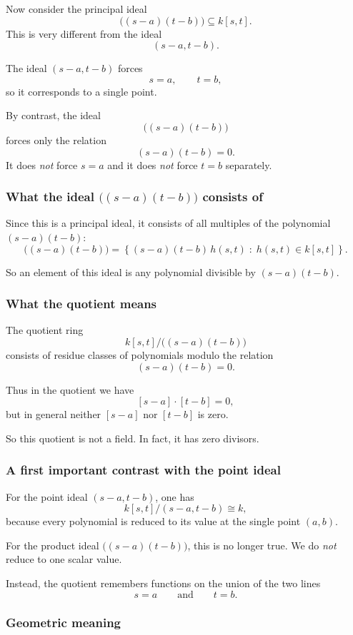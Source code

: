 \documentclass[12pt,a4paper]{article}
\theoremstyle{notespace}
\theoremstyle{definition}
\begin{document}
Now consider the principal ideal
\[
\bigl((s-a)(t-b)\bigr)\subseteq k[s,t].
\]
This is very different from the ideal
\[
(s-a,t-b).
\]

The ideal \((s-a,t-b)\) forces
\[
s=a,\qquad t=b,
\]
so it corresponds to a single point.

By contrast, the ideal
\[
\bigl((s-a)(t-b)\bigr)
\]
forces only the relation
\[
(s-a)(t-b)=0.
\]
It does \emph{not} force \(s=a\) and it does \emph{not} force \(t=b\) separately.

\subsubsection{What the ideal \(\bigl((s-a)(t-b)\bigr)\) consists of}

Since this is a principal ideal, it consists of all multiples of the polynomial \((s-a)(t-b)\):
\[
\bigl((s-a)(t-b)\bigr)
=
\left\{(s-a)(t-b)\,h(s,t)\;:\; h(s,t)\in k[s,t]\right\}.
\]

So an element of this ideal is any polynomial divisible by \((s-a)(t-b)\).

\subsubsection{What the quotient means}

The quotient ring
\[
k[s,t]\big/\bigl((s-a)(t-b)\bigr)
\]
consists of residue classes of polynomials modulo the relation
\[
(s-a)(t-b)=0.
\]

Thus in the quotient we have
\[
[s-a]\cdot [t-b]=0,
\]
but in general neither \([s-a]\) nor \([t-b]\) is zero.

So this quotient is not a field. In fact, it has zero divisors.

\subsubsection{A first important contrast with the point ideal}

For the point ideal \((s-a,t-b)\), one has
\[
k[s,t]/(s-a,t-b)\cong k,
\]
because every polynomial is reduced to its value at the single point \((a,b)\).

For the product ideal \(\bigl((s-a)(t-b)\bigr)\), this is no longer true.  
We do \emph{not} reduce to one scalar value.

Instead, the quotient remembers functions on the union of the two lines
\[
s=a
\qquad\text{and}\qquad
t=b.
\]

\subsubsection{Geometric meaning}
\end{document}
